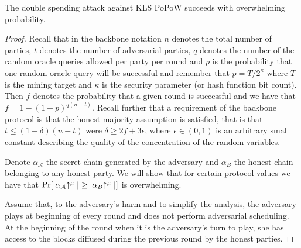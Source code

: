\begin{theorem}
The double spending attack against KLS PoPoW succeeds with overwhelming
probability.
\end{theorem}
\begin{proof}
Recall that in the backbone notation $n$ denotes the total number of parties,
$t$ denotes the number of adversarial parties, $q$ denotes the number of the
random oracle queries allowed per party per round and $p$ is the probability that
one random oracle query will be successful and remember that $p = T / 2^\kappa$
where $T$ is the mining target and $\kappa$ is the security parameter (or hash
function bit count). Then $f$ denotes the probability that a given round is
successful and we have that $f = 1 - (1 - p)^{q(n-t)}$. Recall further that a
requirement of the backbone protocol is that the honest majority assumption is
satisfied, that is that $t \leq (1 - \delta)(n - t)$ were $\delta \geq 2f +
3\epsilon$, where $\epsilon \in (0, 1)$ is an arbitrary small constant describing
the quality of the concentration of the random variables.

Denote $\alpha_\mathcal{A}$ the secret chain generated by the adversary and
$\alpha_B$ the honest chain belonging to any honest party. We will show that
for certain protocol values we have that
$\Pr[|\alpha_\mathcal{A}\negthickspace\uparrow^\mu| \geq |\alpha_B\negthickspace\uparrow^\mu|]$ is
overwhelming.

Assume that, to the adversary's harm and to simplify the analysis, the adversary
plays at beginning of every round and does not perform adversarial scheduling.
At the beginning of the round when it is the adversary's turn to play, she has
access to the blocks diffused during the previous round by the honest parties.


\end{proof}

